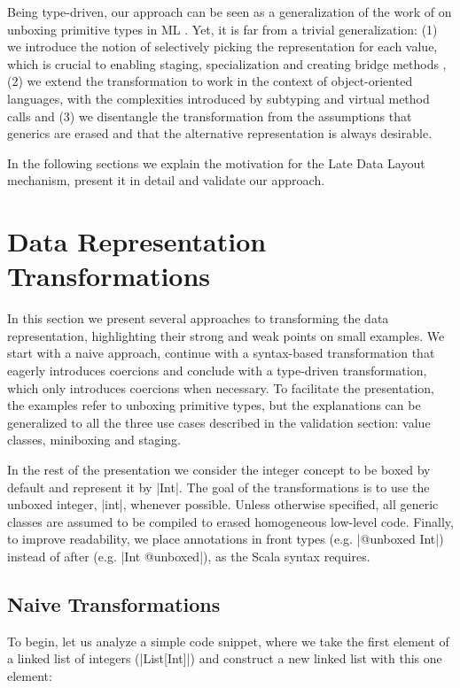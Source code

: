 Being type-driven, our approach can be seen as a generalization of the work of  on unboxing primitive types in ML \cite{leroy-unboxed-objects}. Yet, it is far from a trivial generalization: (1) we introduce the notion of selectively picking the representation for each value, which is crucial to enabling staging, specialization and creating bridge methods \cite{cartwright-nextgen}, (2) we extend the transformation to work in the context of object-oriented languages, with the complexities introduced by subtyping and virtual method calls and (3) we disentangle the transformation from the assumptions that generics are erased and that the alternative representation is always desirable.

In the following sections we explain the motivation for the Late Data Layout mechanism, present it in detail and validate our approach.

\section{Data Representation Transformations}
\label{ldl:sec:problem}

In this section we present several approaches to transforming the data representation, highlighting their strong and weak points on small examples. We start with a naive approach, continue with a syntax-based transformation that eagerly introduces coercions and conclude with a type-driven transformation, which only introduces coercions when necessary. To facilitate the presentation, the examples refer to unboxing primitive types, but the explanations can be generalized to all the three use cases described in the validation section: value classes, miniboxing and staging.

In the rest of the presentation we consider the integer concept to be boxed by default and represent it by |Int|. The goal of the transformations is to use the unboxed integer, |int|, whenever possible. Unless otherwise specified, all generic classes are assumed to be compiled to erased homogeneous low-level code. Finally, to improve readability, we place annotations in front types (e.g. |@unboxed Int|) instead of after (e.g. |Int @unboxed|), as the Scala syntax requires.

\subsection{Naive Transformations}

To begin, let us analyze a simple code snippet, where we take the first element of a linked list of integers (|List[Int]|) and construct a new linked list with this one element:

